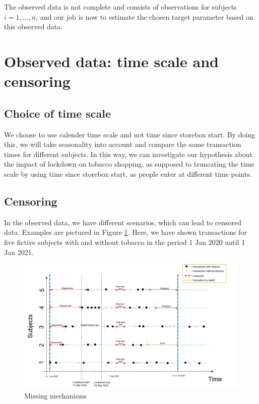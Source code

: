 \documentclass[
  11pt,
]{article}
\begin{document}
The observed data is not complete and consists of observations for
subjects \(i=1,...,n\), and our job is now to estimate the chosen target
parameter based on this observed data.

\hypertarget{observed-data-time-scale-and-censoring}{%
\section{Observed data: time scale and
censoring}\label{observed-data-time-scale-and-censoring}}

\hypertarget{choice-of-time-scale}{%
\subsection{Choice of time scale}\label{choice-of-time-scale}}

We choose to use calender time scale and not time since storebox start.
By doing this, we will take seasonality into account and compare the
same transaction times for different subjects. In this way, we can
investigate our hypothesis about the impact of lockdown on tobacco
shopping, as supposed to truncating the time scale by using time since
storebox start, as people enter at different time points.

\hypertarget{censoring}{%
\subsection{Censoring}\label{censoring}}

In the observed data, we have different scenarios, which can lead to
censored data. Examples are pictured in Figure \ref{missing}. Here, we
have shown transactions for five fictive subjects with and without
tobacco in the period 1 Jan 2020 until 1 Jan 2021.

\begin{center}
\begin{figure}
\includegraphics[]{MissingData.png}
\caption{Missing mechanisms}
\label{missing}
\end{figure}
\end{center}
\end{document}
